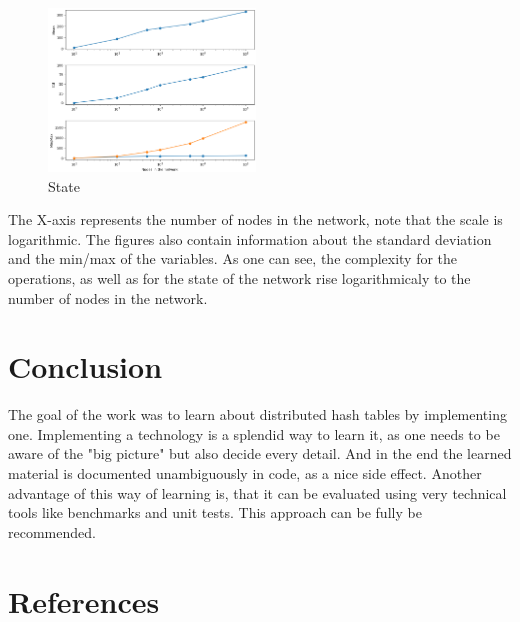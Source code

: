\documentclass[a4paper, 12pt]{article} %
\begin{document}
\begin{figure}
    \begin{center}
        \includegraphics[width=0.49\textwidth]{images/state_figure.png}
    \end{center}
    \caption{State}
\end{figure}

The X-axis represents the number of nodes in the network, note that the scale is logarithmic. The figures also contain information about the standard deviation and the min/max of the variables. As one can see, the complexity for the operations, as well as for the state of the network rise logarithmicaly to the number of nodes in the network. 

\newpage
\section{Conclusion}


The goal of the work was to learn about distributed hash tables by implementing one. Implementing a technology is a splendid way to learn it, as one needs to be aware of the "big picture" but also decide every detail. And in the end the learned material is documented unambiguously in code, as a nice side effect. Another advantage of this way of learning is, that it can be evaluated using very technical tools like benchmarks and unit tests. This approach can be fully be recommended.




\newpage
\section{References}
\printbibliography[heading=none]
\end{document}
